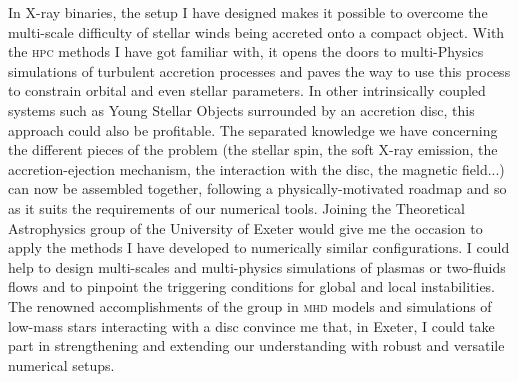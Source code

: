 \documentclass[a4paper,12pt,onecolumn]{article}
\begin{document}

\indent In X-ray binaries, the setup I have designed makes it possible to overcome the multi-scale difficulty of stellar winds being accreted onto a compact object. With the \textsc{hpc} methods I have got familiar with, it opens the doors to multi-Physics simulations of turbulent accretion processes and paves the way to use this process to constrain orbital and even stellar parameters. In other intrinsically coupled systems such as Young Stellar Objects surrounded by an accretion disc, this approach could also be profitable. The separated knowledge we have concerning the different pieces of the problem (the stellar spin, the soft X-ray emission, the accretion-ejection mechanism, the interaction with the disc, the magnetic field...) can now be assembled together, following a physically-motivated roadmap and so as it suits the requirements of our numerical tools. Joining the Theoretical Astrophysics group of the University of Exeter would give me the occasion to apply the methods I have developed to numerically similar configurations. I could help to design multi-scales and multi-physics simulations of plasmas or two-fluids flows and to pinpoint the triggering conditions for global and local instabilities. The renowned accomplishments of the group in \textsc{mhd} models and simulations of low-mass stars interacting with a disc convince me that, in Exeter, I could take part in strengthening and extending our understanding with robust and versatile numerical setups.
\end{document}
